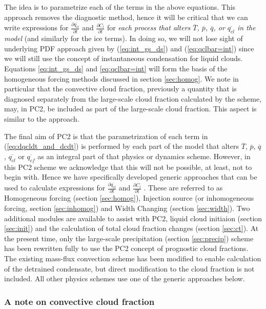 \documentclass{UMDP_article}
\begin{document}
The idea is to parametrize each of the terms in the above equations. This
approach removes the diagnostic method, hence it will be critical that
we can write expressions for $\frac{\partial \overline{q_{cl}}}{\partial t}$
and
$\frac{\partial C_l}{\partial t}$ for \textit{each process that alters
$\overline{T}$, $\overline{p}$,
$\overline{q}$, or $\overline{q_{cl}}$ in the model} (and similarly
for the ice terms). In doing so,
we will not lose sight of underlying PDF approach given by
(\ref{eq:int_gs_ds}) and (\ref{eq:qclbar=int}) since we will still use
the concept of
instantaneous condensation for liquid clouds. Equations
\ref{eq:int_gs_ds} and \ref{eq:qclbar=int} will form the
basis of the homogeneous forcing methods discussed in section
\ref{sec:homog}.
We note in particular that the convective cloud fraction,
previously a quantity that is diagnosed separately from the 
large-scale cloud fraction calculated by the \cite{smith90} scheme,
may, in PC2, be included as part of the large-scale
cloud fraction. This aspect is similar to the \cite{t93} approach.

The final aim of PC2 is
that the parametrization of each term in (\ref{eq:dqcldt_and_dcdt})
is performed by each part of the model that alters $\overline{T}$,
$\overline{p}$,
$\overline{q}$, $\overline{q_{cl}}$ or $\overline{q_{cf}}$ as an
integral part of that physics or dynamics scheme. 
However, in this PC2 scheme we acknowledge that this will not be possible,
at least, not to begin with.
Hence we have specifically developed generic approaches
that can be used to calculate expressions for
$\frac{\partial \overline{q_{cl}}}{\partial t}$ and $\frac{\partial C_l}
{\partial t}$ .
These are referred to as Homogeneous forcing (section \ref{sec:homog}),
Injection source (or inhomogeneous forcing, section \ref{sec:inhomog})
and Width Changing (section \ref{sec:width}). Two additional modules
are available to assist with PC2, liquid cloud initiaion (section
\ref{sec:init}) and the calculation of total cloud fraction changes
(section \ref{sec:ct}). At
the present time, only the large-scale precipitation (section
\ref{sec:precip}) scheme has been rewritten fully to use the PC2
concept of prognostic cloud fractions. The existing mass-flux
convection scheme has been modified to enable calculation of the detrained
condensate, but direct modification to the cloud fraction is not
included. All other physics schemes use one of the generic
approaches below.

\subsubsection{A note on convective cloud fraction}
\end{document}
